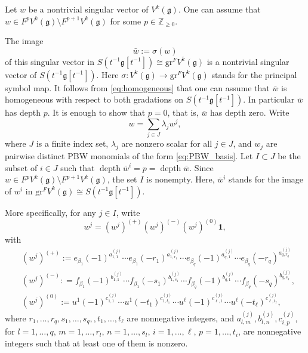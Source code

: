\documentclass[JEP,XML,SOM,Unicode]{cedram}
\let\be\beta
\newcommand\Z{{\mathbb Z}}
\DeclareMathOperator{\dep}{depth}
\newcommand \g{\mathfrak g}
\theoremstyle{definition}
\begin{document}
Let $w$ be a nontrivial singular vector of $V^k(\g)$.
One can assume that $w \in F^p V^k(\g) \setminus F^{p+1} V^k(\g)$ for
some $p\in \Z_{\geq 0}$.

The image
\[
\bar{w}:=\sigma(w)
\]
of this singular vector in $S(t^{-1}\g[t^{-1}]) \cong \mathrm{gr}^F V^k(\g)$
is a nontrivial singular vector of $S(t^{-1}\g[t^{-1}])$.
Here $\sigma \colon V^k(\g) \to \mathrm{gr}^F V^k(\g)$
stands for the principal symbol map.
It follows from \eqref{eq:homogeneous}
that one can assume that $\bar{w}$ is homogeneous with respect to both gradations
on $S(t^{-1}\g[t^{-1}])$.
In particular $\bar w$ has depth $p$. It is enough to show that
$p=0$, that is, $\bar w$ has depth zero.
Write
\[
w = \sum_{j \in J} \lambda_j w^j,
\]
where $J$ is a finite index set, $\lambda_j $ are nonzero
scalar for all $j \in J$,
and $w_j$ are pairwise distinct PBW monomials of the form \eqref{eq:PBW_basis}.
Let $I \subset J$ be the subset of $i \in J$ such that $\dep \bar w^{i} = p = \dep \bar w$.
Since $w \in F^p V^k(\g) \setminus F^{p+1} V^k(\g)$,
the set $I$ is nonempty.
Here, $\bar{w}^{i}$ stands for the image of $w^{i}$ in $\mathrm{gr}^F V^k(\g) \cong S(t^{-1}\g[t^{-1}])$.

More specifically, for any $j \in I$, write
\begin{equation}
\label{eq:PBW_w_i}
w^{j} = (w^{j})^{(+)} (w^{j})^{(-)} (w^{j})^{(0)} \mathbf{1},
\end{equation}
with
\begin{align*}
& (w^{j})^{(+)} := e_{\be_{1}}(-1)^{a_{1,1}^{(j)}}\cdots
e_{\be_{1}} (- r_1)^{a_{1,r_1}^{(j)}}\cdots
e_{\be_q}(- 1)^{a_{q,1}^{(j)}}\cdots e_{\be_q}(- r_q)^{a_{q,r_q}^{(j)}} \\\nonumber
& (w^{j})^{(-)} : =f_{\be_1}(-1)^{b_{1,1}^{(j)}}\cdots f_{\be_1}(- s_1)^{b_{1,s_1}^{(j)}}\cdots
f_{\be_q}(- 1)^{b_{q,1}^{(j)}}
\cdots f_{\be_q}(- s_q)^{b_{q,s_q}^{(j)}}, \\\nonumber
& (w^{j})^{(0)} := u^1(- 1)^{c_{1,1}^{(j)}}\cdots u^1(- t_1)^{c_{1,t_1}^{(j)}}
\cdots u^\ell (- 1)^{c_{\ell,1}^{(j)}}\cdots u^\ell(- t_\ell)^{c_{\ell, t_\ell}^{(j)}},
\end{align*}
where $r_1,\dots,r_q, s_1,\dots,s_q,,t_1,\dots,t_\ell$
are nonnegative integers, and
$a_{l,m}^{(j)},b_{l,n}^{(j)},c_{i,p}^{(j)}$, for $l =1,\dots,q$,
$m=1,\dots,r_l$, $n=1,\dots,s_l$,
$i =1,\dots,\ell$,
$p=1,\dots,t_i$,
are nonnegative integers such
that at least one of them is nonzero.
\end{document}
